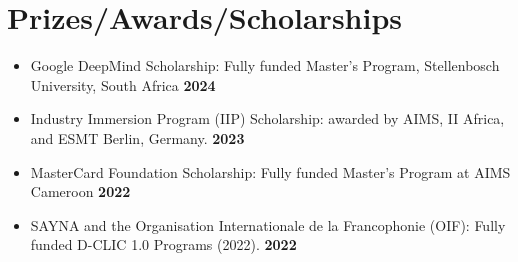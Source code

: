 \documentclass[a4paper, oneside, 10pt]{article}
\begin{document}
\section{Prizes/Awards/Scholarships}
\begin{itemize}
\item[\faTrophy]
Google DeepMind Scholarship: Fully funded Master's Program, Stellenbosch University, South Africa  \hfill \textbf{\color{emphasis}2024}%

\item[\faTrophy]
Industry Immersion Program (IIP) Scholarship: awarded by AIMS, II Africa, and ESMT Berlin, Germany.\hfill \textbf{\color{emphasis}
2023}

\item[\faTrophy] MasterCard Foundation Scholarship: Fully funded Master's Program at AIMS Cameroon
\hfill \textbf{\color{emphasis}
2022}

\item[\faTrophy] SAYNA and the Organisation Internationale de la Francophonie (OIF): Fully funded D-CLIC 1.0 Programs (2022).\hfill \textbf{\color{emphasis}
2022}
\end{itemize}
\end{document}
